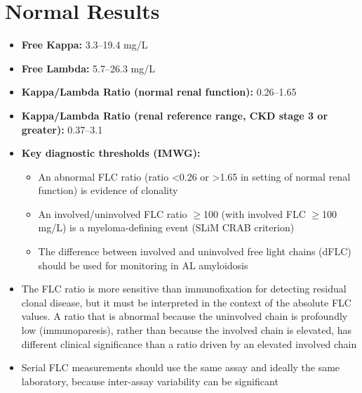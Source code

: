 \section*{Normal Results}
\begin{itemize}
  \item \textbf{Free Kappa:} 3.3--19.4 mg/L
  \item \textbf{Free Lambda:} 5.7--26.3 mg/L
  \item \textbf{Kappa/Lambda Ratio (normal renal function):} 0.26--1.65
  \item \textbf{Kappa/Lambda Ratio (renal reference range, CKD stage 3 or greater):} 0.37--3.1
  \item \textbf{Key diagnostic thresholds (IMWG):}
  \begin{itemize}
    \item An abnormal FLC ratio (ratio <0.26 or >1.65 in setting of normal renal function) is evidence of clonality
    \item An involved/uninvolved FLC ratio $\geq$100 (with involved FLC $\geq$100 mg/L) is a myeloma-defining event (SLiM CRAB criterion)
    \item The difference between involved and uninvolved free light chains (dFLC) should be used for monitoring in AL amyloidosis
  \end{itemize}
  \item The FLC ratio is more sensitive than immunofixation for detecting residual clonal disease, but it must be interpreted in the context of the absolute FLC values. A ratio that is abnormal because the uninvolved chain is profoundly low (immunoparesis), rather than because the involved chain is elevated, has different clinical significance than a ratio driven by an elevated involved chain
  \item Serial FLC measurements should use the same assay and ideally the same laboratory, because inter-assay variability can be significant
\end{itemize}


